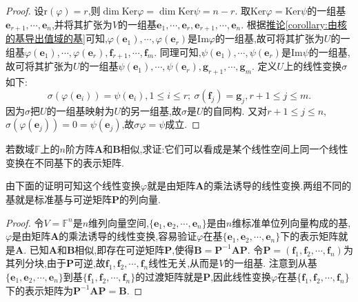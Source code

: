 \documentclass[../../main.tex]{subfiles}
\begin{document}
\begin{proof}
设\(\text{r}(\varphi)=r\),则\(\dim\text{Ker}\varphi=\dim\text{Ker}\psi=n - r\). 取\(\text{Ker}\varphi=\text{Ker}\psi\)的一组基\(\boldsymbol{e}_{r + 1},\cdots,\boldsymbol{e}_n\),并将其扩张为\(V\)的一组基\(\boldsymbol{e}_1,\cdots,\boldsymbol{e}_r,\boldsymbol{e}_{r + 1},\cdots,\boldsymbol{e}_n\). 根据\hyperref[corollary:由核的基导出值域的基]{推论\ref{corollary:由核的基导出值域的基}}可知,\(\varphi(\boldsymbol{e}_1),\cdots,\varphi(\boldsymbol{e}_r)\)是\(\text{Im}\varphi\)的一组基,故可将其扩张为\(U\)的一组基\(\varphi(\boldsymbol{e}_1),\cdots,\varphi(\boldsymbol{e}_r),\boldsymbol{f}_{r + 1},\cdots,\boldsymbol{f}_m\). 同理可知,\(\psi(\boldsymbol{e}_1),\cdots,\psi(\boldsymbol{e}_r)\)是\(\text{Im}\psi\)的一组基,故可将其扩张为\(U\)的一组基\(\psi(\boldsymbol{e}_1),\cdots,\psi(\boldsymbol{e}_r),\boldsymbol{g}_{r + 1},\cdots,\boldsymbol{g}_m\). 定义\(U\)上的线性变换\(\sigma\)如下:
\[
\sigma(\varphi(\boldsymbol{e}_i))=\psi(\boldsymbol{e}_i),1\leqslant  i\leqslant  r;\ \sigma(\boldsymbol{f}_j)=\boldsymbol{g}_j,r + 1\leqslant  j\leqslant  m.
\]
因为\(\sigma\)把\(U\)的一组基映射为\(U\)的另一组基,故\(\sigma\)是\(U\)的自同构. 又对\(r + 1\leqslant  j\leqslant  n\),\(\sigma(\varphi(\boldsymbol{e}_j))=0=\psi(\boldsymbol{e}_j)\),故\(\sigma\varphi=\psi\)成立. 
\end{proof}

\begin{proposition}\label{proposition:相似矩阵可看作一个线性变换在不同基下的表示矩阵}
若数域\(\mathbb{F}\)上的\(n\)阶方阵\(\boldsymbol{A}\)和\(\boldsymbol{B}\)相似,求证:它们可以看成是某个线性空间上同一个线性变换在不同基下的表示矩阵.
\end{proposition}
\begin{note}
由下面的证明可知这个线性变换\(\varphi\)就是由矩阵\(\boldsymbol{A}\)的乘法诱导的线性变换.两组不同的基就是标准基与可逆矩阵\(\boldsymbol{P}\)的列向量.
\end{note}
\begin{proof}
令\(V = \mathbb{F}^n\)是\(n\)维列向量空间,\(\{\boldsymbol{e}_1,\boldsymbol{e}_2,\cdots,\boldsymbol{e}_n\}\)是由\(n\)维标准单位列向量构成的基,\(\varphi\)是由矩阵\(\boldsymbol{A}\)的乘法诱导的线性变换,容易验证\(\varphi\)在基\(\{\boldsymbol{e}_1,\boldsymbol{e}_2,\cdots,\boldsymbol{e}_n\}\)下的表示矩阵就是\(\boldsymbol{A}\). 已知\(\boldsymbol{A}\)和\(\boldsymbol{B}\)相似,即存在可逆矩阵\(\boldsymbol{P}\),使得\(\boldsymbol{B}=\boldsymbol{P}^{-1}\boldsymbol{A}\boldsymbol{P}\).
令\(\boldsymbol{P}=(\boldsymbol{f}_1,\boldsymbol{f}_2,\cdots,\boldsymbol{f}_n)\)为其列分块,由于\(\boldsymbol{P}\)可逆,故\(\boldsymbol{f}_1,\boldsymbol{f}_2,\cdots,\boldsymbol{f}_n\)线性无关,从而是\(V\)的一组基. 注意到从基\(\{\boldsymbol{e}_1,\boldsymbol{e}_2,\cdots,\boldsymbol{e}_n\}\)到基\(\{\boldsymbol{f}_1,\boldsymbol{f}_2,\cdots,\boldsymbol{f}_n\}\)的过渡矩阵就是\(\boldsymbol{P}\),因此线性变换\(\varphi\)在基\(\{\boldsymbol{f}_1,\boldsymbol{f}_2,\cdots,\boldsymbol{f}_n\}\)下的表示矩阵为\(\boldsymbol{P}^{-1}\boldsymbol{A}\boldsymbol{P}=\boldsymbol{B}\). 
\end{proof}
\end{document}
